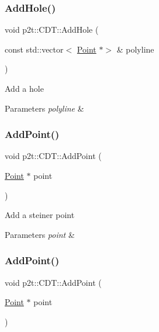 \subsubsection{\texorpdfstring{Add\+Hole()}{AddHole()}\hspace{0.1cm}{\footnotesize\ttfamily [2/2]}}
{\footnotesize\ttfamily void p2t\+::\+C\+D\+T\+::\+Add\+Hole (\begin{DoxyParamCaption}\item[{const std\+::vector$<$ \hyperlink{structp2t_1_1Point}{Point} $\ast$$>$ \&}]{polyline }\end{DoxyParamCaption})}

Add a hole


\begin{DoxyParams}{Parameters}
{\em polyline} & \\
\hline
\end{DoxyParams}
\mbox{\label{classp2t_1_1CDT_acf36ab360e46f084c7df31acc7d845c1}} 
\subsubsection{\texorpdfstring{Add\+Point()}{AddPoint()}\hspace{0.1cm}{\footnotesize\ttfamily [1/2]}}
{\footnotesize\ttfamily void p2t\+::\+C\+D\+T\+::\+Add\+Point (\begin{DoxyParamCaption}\item[{\hyperlink{structp2t_1_1Point}{Point} $\ast$}]{point }\end{DoxyParamCaption})}

Add a steiner point


\begin{DoxyParams}{Parameters}
{\em point} & \\
\hline
\end{DoxyParams}
\mbox{\label{classp2t_1_1CDT_acf36ab360e46f084c7df31acc7d845c1}} 
\subsubsection{\texorpdfstring{Add\+Point()}{AddPoint()}\hspace{0.1cm}{\footnotesize\ttfamily [2/2]}}
{\footnotesize\ttfamily void p2t\+::\+C\+D\+T\+::\+Add\+Point (\begin{DoxyParamCaption}\item[{\hyperlink{structp2t_1_1Point}{Point} $\ast$}]{point }\end{DoxyParamCaption})}

